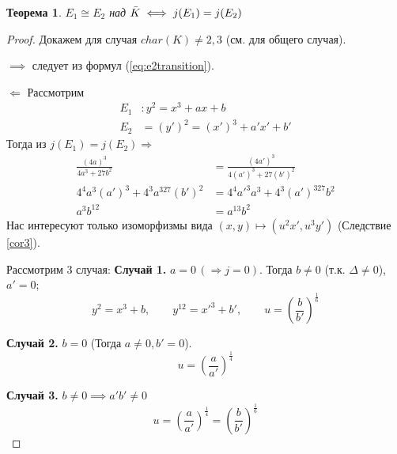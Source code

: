\documentclass[12pt]{article}
\newtheorem{theorem}{Теорема}
\theoremstyle{definition}
\theoremstyle{definition}
\theoremstyle{definition}
\begin{document}
            \begin{theorem}
                $E_1 \cong E_2$ над $\Bar{K} \iff j(E_1)=j(E_2)$
            \end{theorem}
            \begin{proof}
                Докажем для случая $char(K)\neq 2,3$ (см. \cite{silverman} для общего случая).
                
                $\implies$ следует из формул (\ref{eq:e2transition}).
                
                $\Longleftarrow$ Рассмотрим
                \begin{align*}
                    E_1&:y^2=x^3+ax+b \\
                    E_2&=(y')^2 = (x')^3+a'x'+b'
                \end{align*}
                Тогда из $j(E_1)=j(E_2) \Rightarrow$
                \begin{align*}
                    \frac{(4a)^3}{4a^3+27b^2} &= \frac{(4a')^3}{4(a')^3+27(b')^2} \\
                    4^4a^3(a')^3 + 4^3a^327(b')^2 &= 4^4 a'^3a^3 + 4^3(a')^327b^2 \\
                    a^3b^{12} &= a^{13}b^2 \tag{*}
                \end{align*}
                Нас интересуют только изоморфизмы вида $(x,y)\mapsto(u^2x', u^3y')$ (Следствие \ref{cor3}).
                
                Рассмотрим 3 случая: \newline
                \textbf{Случай 1.} $a = 0 \,(\Rightarrow j=0)$. Тогда $b\neq0$ (т.к. $\Delta \neq0$), $a'=0$;
                \begin{equation*}
                    y^2=x^3+b, \quad \quad y^{12} = x'^3 + b', \quad \quad u=\left(\frac{b}{b'}\right)^{\frac{1}{6}}
                \end{equation*}
                
                \textbf{Случай 2.} $b=0$ (Тогда $a \neq 0, b' = 0$).
                \[
                     u = \left(\frac{a}{a'}\right)^{\frac{1}{4}}
                \]
                
                \textbf{Случай 3.} $b\neq0 \implies a'b' \neq0$ 
                \[
                    u = \left(\frac{a}{a'}\right)^{\frac{1}{4}} = \left(\frac{b}{b'}\right)^{\frac{1}{6}}
                \]
            \end{proof}
            
\end{document}
